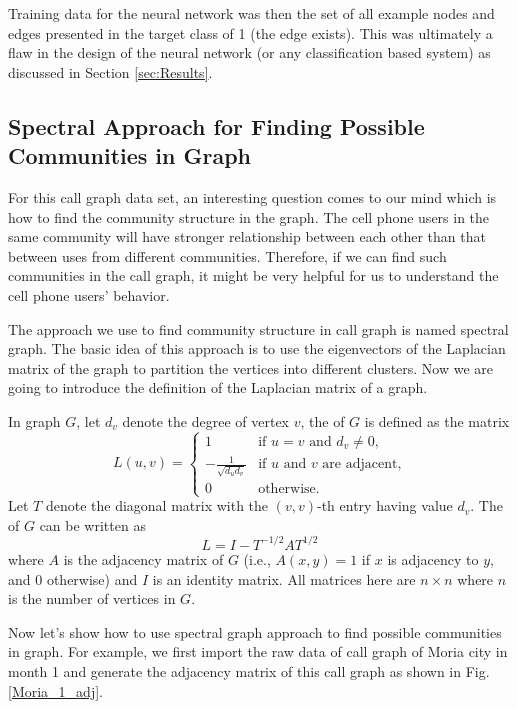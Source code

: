 Training data for the neural network was then the set of all example nodes and edges presented in the target class of 1 (the edge exists). This was ultimately a flaw in the design of the neural network (or any classification based system) as discussed in Section \ref{sec:Results}.

\subsection{Spectral Approach for Finding Possible Communities in Graph}
For this call graph data set, an interesting question comes to our mind which is how to find the community structure in the graph. The cell phone users in the same community will have stronger relationship between each other than that between uses from different communities. Therefore, if we can find such communities in the call graph, it might be very helpful for us to understand the cell phone users' behavior.

The approach we use to find community structure in call graph is named spectral graph. The basic idea of this approach is to use the eigenvectors of the Laplacian matrix of the graph to partition the vertices into different clusters. Now we are going to introduce the definition of the Laplacian matrix of a graph. 

In graph $G$, let $d_v$ denote the degree of vertex $v$, the  of $G$ is defined as the matrix 
\begin{equation}
L(u,v) = \begin{cases} 1 & \text{if  $u=v$ and $d_v \ne 0$,} \\ -\frac{1}{\sqrt{d_ud_v}} & \text{if $u$ and $v$ are adjacent,} \\ 0 & \text{otherwise.}\end{cases}
\end{equation}    
Let $T$ denote the diagonal matrix with the $(v,v)$-th entry having value $d_v$. The  of $G$ can be written as 
\begin{equation}
L=I-T^{-1/2}AT^{1/2}
\end{equation}
where $A$ is the adjacency matrix of $G$ (i.e., $A(x,y)=1$ if $x$ is adjacency to $y$, and $0$ otherwise) and $I$ is an identity matrix. All matrices here are $n \times n$ where $n$ is the number of vertices in $G$.

Now let's show how to use spectral graph approach to find possible communities in graph. For example, we first import the raw data of call graph of Moria city in month 1 and generate the adjacency matrix of this call graph as shown in Fig. \ref{Moria_1_adj}.

